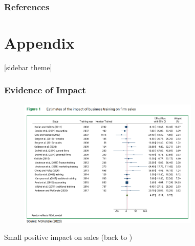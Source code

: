 \documentclass[hideothersubsections, usenames,dvipsnames,11pt]{beamer}
\newenvironment{itemize_2pt}{\itemize\addtolength{\itemsep}{2pt}}{\enditemize}
\begin{document}

\appendix
\begin{frame}[allowframebreaks] %
\frametitle{References}


\end{frame}


\section*{\textbf{Appendix}}

[sidebar theme]



\begin{frame}[label=McK2020_sales]
\frametitle{Evidence of Impact}

	\begin{figure}[htbp]
		\centering
		\includegraphics[width=23.2em]{pics/McK2020_sales.png}
		\label{McKenzie(2020): Sales}
	\end{figure}	
	
	\vspace{-1em}	
	
	\begin{itemize_2pt}
		\item Small positive impact on sales (back to \hyperlink{McK2020_profits}{})
	\end{itemize_2pt}
	
\end{frame}
\end{document}
